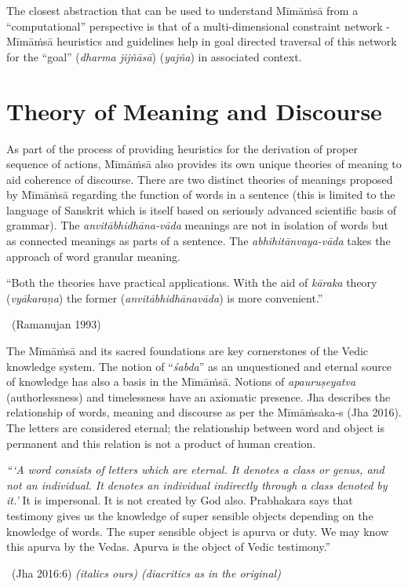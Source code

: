 The closest abstraction that can be used to understand Mīmāṁsā from a “computational” perspective is that of a multi-dimensional constraint network - Mīmāṁsā heuristics and guidelines help in goal directed traversal of this network for the “goal” (\textit{dharma jijñāsā}) (\textit{yajña}) in associated context.


\section*{Theory of Meaning and Discourse}

As part of the process of providing heuristics for the derivation of proper sequence of actions, Mīmāṁsā also provides its own unique theories of meaning to aid coherence of discourse. There are two distinct theories of meanings proposed by Mīmāṁsā regarding the function of words in a sentence (this is limited to the language of Sanskrit which is itself based on seriously advanced scientific basis of grammar). The \textit{anvitābhidhāna-vāda} meanings are not in isolation of words but as connected meanings as parts of a sentence. The \textit{abhihitānvaya-vāda} takes the approach of word granular meaning.

\begin{myquote}
“Both the theories have practical applications. With the aid of \textit{kāraka} theory (\textit{vyākaraṇa}) the former (\textit{anvitābhidhānavāda}) is more convenient.”

~\hfill (Ramanujan 1993)
\end{myquote}

The Mīmāṁsā and its sacred foundations are key cornerstones of the Vedic knowledge system. The notion of “\textit{śabda}” as an unquestioned and eternal source of knowledge has also a basis in the Mīmāṁsā. Notions of \textit{apauruṣeyatva} (authorlessness) and timelessness have an axiomatic presence. Jha describes the relationship of words, meaning and discourse as per the Mīmāṁsaka-s (Jha 2016). The letters are considered eternal; the relationship between word and object is permanent and this relation is not a product of human creation.

\begin{myquote}
\textit{“‘A word consists of letters which are eternal. It denotes a class or genus, and not an individual. It denotes an individual indirectly through a class denoted by it.’} It is impersonal. It is not created by God also. Prabhakara says that testimony gives us the knowledge of super sensible objects depending on the knowledge of words. The super sensible object is apurva or duty. We may know this apurva by the Vedas. Apurva is the object of Vedic testimony.”

~\hfill (Jha 2016:6) \textit{(italics ours) (diacritics as in the original)}
\end{myquote}


